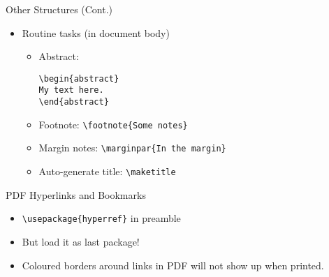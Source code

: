 \begin{frame}[fragile]{Other Structures (Cont.)}
\begin{itemize}
\item Routine tasks (in document body)
\begin{itemize}
\item Abstract:
\begin{lstlisting}
\begin{abstract}
My text here.
\end{abstract}
\end{lstlisting}

\item Footnote: \lstinline|\footnote{Some notes}|
\item Margin notes: \lstinline|\marginpar{In the margin}|
\item Auto-generate title: \lstinline|\maketitle|
\end{itemize}
\end{itemize}
\end{frame}

\begin{frame}[fragile]{PDF Hyperlinks and Bookmarks}
  \begin{itemize}
    \item \lstinline|\usepackage{hyperref}| in preamble
    \item But load it as last package!
    \item Coloured borders around links in PDF will not show up when printed.
  \end{itemize}
\end{frame}












